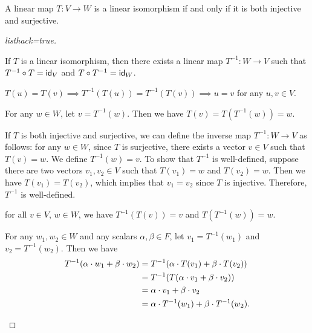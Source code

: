 \begin{proposition}
  A linear map $T \colon V \to W$ is a linear isomorphism if and only if it is both injective and surjective.
\end{proposition}
\begin{proof}[listhack=true]
  \begin{description}[labelwidth=\widthof{\bfseries ($\Rightarrow$):~}]
    \item[($\Rightarrow$)] If $T$ is a linear isomorphism, then there exists a linear map $T^{-1} \colon W \to V$ such that $T^{-1} \circ T = \operatorname{\text{\normalfont\sffamily id}}_V$ and $T \circ T^{-1} = \operatorname{\text{\normalfont\sffamily id}}_W$.
          \begin{description}[labelwidth=\widthof{\bfseries Surjective:~}]
            \item[Injective] $T(u) = T(v) \implies T^{-1}(T(u)) = T^{-1}(T(v)) \implies u = v$ for any $u, v \in V$.
            \item[Surjective] For any $w \in W$, let $v = T^{-1}(w)$. Then we have $T(v) = T(T^{-1}(w)) = w$.
          \end{description}

    \item [($\Leftarrow$)] If $T$ is both injective and surjective, we can define the inverse map $T^{-1} \colon W \to V$ as follows: for any $w \in W$, since $T$ is surjective, there exists a vector $v \in V$ such that $T(v) = w$. We define $T^{-1}(w) = v$. To show that $T^{-1}$ is well-defined, suppose there are two vectors $v_1, v_2 \in V$ such that $T(v_1) = w$ and $T(v_2) = w$. Then we have $T(v_1) = T(v_2)$, which implies that $v_1 = v_2$ since $T$ is injective. Therefore, $T^{-1}$ is well-defined.
          \begin{description}[labelwidth=\widthof{\bfseries Invertible:~}]
            \item[Invertible] for all $v \in V$, $w \in W$, we have $T^{-1}(T(v)) = v$ and $T(T^{-1}(w)) = w$.
            \item[Linearity] For any $w_1, w_2 \in W$ and any scalars $\alpha, \beta \in F$, let $v_1 = T^{-1}(w_1)$ and $v_2 = T^{-1}(w_2)$. Then we have
                  \begin{align*}
                    T^{-1}(\alpha \cdot w_1 + \beta \cdot w_2) & = T^{-1}(\alpha \cdot T(v_1) + \beta \cdot T(v_2))             \\
                                                               & = T^{-1}(T(\alpha \cdot v_1 + \beta \cdot v_2))                \\
                                                               & = \alpha \cdot v_1 + \beta \cdot v_2                           \\
                                                               & = \alpha \cdot T^{-1}(w_1) + \beta \cdot T^{-1}(w_2). \qedhere
                  \end{align*}
          \end{description}
  \end{description}
\end{proof}


